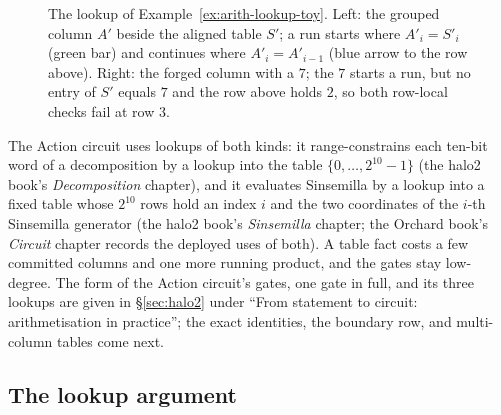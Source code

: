 \documentclass[11pt,a4paper]{article}
\theoremstyle{definition}
\begin{document}
\begin{figure}[htbp]
\caption{The lookup of Example~\ref{ex:arith-lookup-toy}. Left: the
grouped column $A'$ beside the aligned table $S'$; a run starts where
$A'_i = S'_i$ (green bar) and continues where $A'_i = A'_{i-1}$ (blue
arrow to the row above). Right: the forged column with a $7$; the $7$
starts a run, but no entry of $S'$ equals $7$ and the row above holds
$2$, so both row-local checks fail at row $3$.}
\label{fig:lookup-runs}
\end{figure}

The Action circuit uses lookups of both kinds: it range-constrains each
ten-bit word of a decomposition by a lookup into the table
$\{0, \dots, 2^{10}-1\}$ (the halo2 book's \emph{Decomposition}
chapter), and it evaluates Sinsemilla by a lookup into a fixed table
whose $2^{10}$ rows hold an index $i$ and the two coordinates of the
$i$-th Sinsemilla generator (the halo2 book's \emph{Sinsemilla} chapter;
the Orchard book's \emph{Circuit} chapter records the deployed uses of
both). A table fact costs a few committed columns and one more running
product, and the gates stay low-degree. The form of the Action circuit's
gates, one gate in full, and its three lookups are given in
\S\ref{sec:halo2} under ``From statement to circuit: arithmetisation in
practice''; the exact identities, the boundary row, and multi-column tables
come next.

\subsection{The lookup argument}
\label{sec:arith-lookup-arg}
\end{document}
